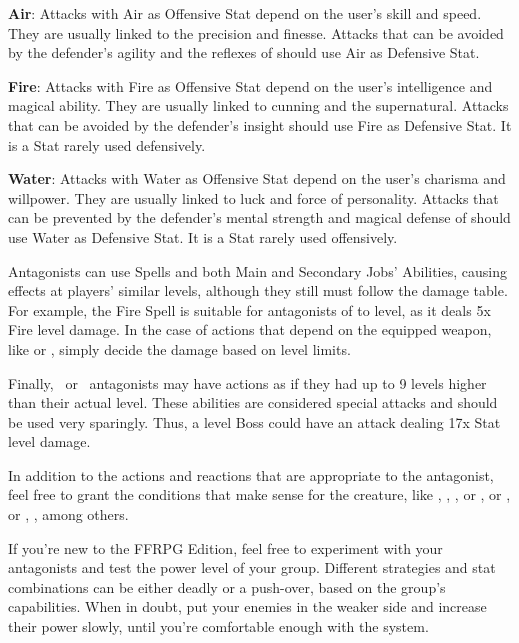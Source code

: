 \begin{multicols}{2}
\textbf{Air}: Attacks with Air as Offensive Stat depend on the user’s skill and speed. They are usually linked to the precision and finesse. Attacks that can be avoided by the defender’s agility and the reflexes of should use Air as Defensive Stat.

\textbf{Fire}: Attacks with Fire as Offensive Stat depend on the user’s intelligence and magical ability. They are usually linked to cunning and the supernatural. Attacks that can be avoided by the defender’s insight should use Fire as Defensive Stat. It is a Stat rarely used defensively.

\textbf{Water}: Attacks with Water as Offensive Stat depend on the user’s charisma and willpower. They are usually linked to luck and force of personality. Attacks that can be prevented by the defender’s mental strength and magical defense of should use Water as Defensive Stat. It is a Stat rarely used offensively.

Antagonists can use Spells and both Main and Secondary Jobs’ Abilities, causing effects at players’ similar levels, although they still must follow the damage table. For example, the Fire Spell is suitable for antagonists of  to  level, as it deals 5x Fire level damage. In the case of actions that depend on the equipped weapon, like  or , simply decide the damage based on level limits.

Finally, \tmobleet\ or \tmobboss\ antagonists may have actions as if they had up to 9 levels higher than their actual level. These abilities are considered special attacks and should be used very sparingly. Thus, a  level Boss could have an attack dealing 17x Stat level damage.

In addition to the actions and reactions that are appropriate to the antagonist, feel free to grant the conditions that make sense for the creature, like , , ,  or ,  or ,  or , , among others.

If you’re new to the FFRPG  Edition, feel free to experiment with your antagonists and test the power level of your group. Different strategies and stat combinations can be either deadly or a push-over, based on the group’s capabilities. When in doubt, put your enemies in the weaker side and increase their power slowly, until you’re comfortable enough with the system.


\end{multicols}

